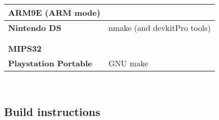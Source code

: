 \begin{tabular}{l l}
{\bf{\large ARM9E (ARM mode)}} &                               \\
\hline\hline
{\bf Nintendo DS} & nmake (and devkitPro\cite{devkitPro} tools)\\
\hline
                   &                                           \\
                   &                                           \\

{\bf{\large MIPS32}} &                                         \\
\hline\hline
{\bf Playstation Portable} & GNU make                          \\
\hline

\end{tabular}\\

\pagebreak

\subsection{Build instructions}


